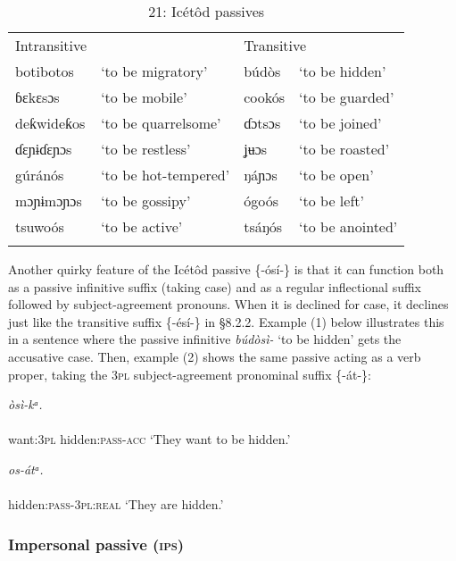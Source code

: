 \begin{table}
\caption{21: Icétôd passives}
\label{tab:8}


\begin{tabularx}{\textwidth}{XXXX}
\lsptoprule

Intransitive &  & \multicolumn{2}{X}{Transitive}\\
botibotos & ‘to be migratory’ & búdòs & ‘to be hidden’\\
ɓɛkɛsɔs & ‘to be mobile’ & cookós & ‘to be guarded’\\
deƙwideƙos & ‘to be quarrelsome’ & ɗɔtsɔs & ‘to be joined’\\
ɗɛɲɨɗɛɲɔs & ‘to be restless’ & ʝʉɔs & ‘to be roasted’\\
gúránós & ‘to be hot-tempered’ & ŋáɲɔs & ‘to be open’\\
mɔɲɨmɔɲɔs & ‘to be gossipy’ & ógoós & ‘to be left’\\
tsuwoós & ‘to be active’ & tsáŋós & ‘to be anointed’\\
\lspbottomrule
\end{tabularx}
\end{table}
Another quirky feature of the Icétôd passive \{-ósí-\} is that it can function both as a passive infinitive suffix (taking case) and as a regular inflectional suffix followed by subject-agreement pronouns. When it is declined for case, it declines just like the transitive suffix \{-ésí-\} in §8.2.2. Example (1) below illustrates this in a sentence where the passive infinitive \textit{búdòsì-} ‘to be hidden’ gets the accusative case. Then, example (2) shows the same passive acting as a verb proper, taking the 3\textsc{pl} subject-agreement pronominal suffix \{-át-\}:




\ea\label{ex:}
\textit{òsì}\textit{{}-kᵃ.} \\
    \\
want:\textsc{3pl}   hidden:\textsc{pass-acc}
\glt ‘They want to be hidden.’ 
\z




\ea\label{ex:}
\textit{os}\textit{{}-átᵃ.} \\
    \\
hidden:\textsc{pass}{}-\textsc{3pl:real}
\glt ‘They are hidden.’ 
\z




\subsubsection{Impersonal passive (\textsc{ips})}

